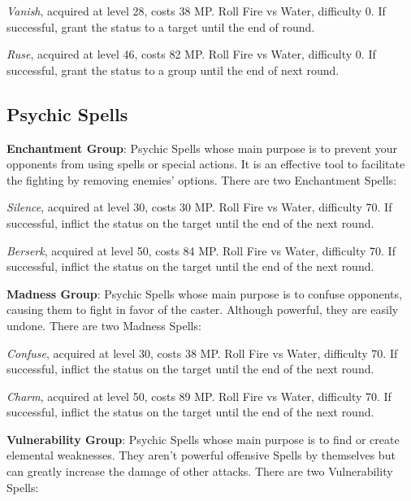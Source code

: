 \begin{multicols}{2}
    \textit{Vanish}, acquired at level 28, costs 38 MP\@. Roll Fire vs Water, difficulty 0. If successful, grant the  status to a target until the end of round.

    \textit{Ruse}, acquired at level 46, costs 82 MP\@. Roll Fire vs Water, difficulty 0. If successful, grant the  status to a group until the end of next round.

    \subsection{Psychic Spells}\label{subsec:white-psychic}

    \textbf{Enchantment Group}: Psychic Spells whose main purpose is to prevent your opponents from using spells or special actions. It is an effective tool to facilitate the fighting by removing enemies’ options. There are two Enchantment Spells:

    \textit{Silence}, acquired at level 30, costs 30 MP\@. Roll Fire vs Water, difficulty 70. If successful, inflict the  status on the target until the end of the next round.

    \textit{Berserk}, acquired at level 50, costs 84 MP\@. Roll Fire vs Water, difficulty 70. If successful, inflict the  status on the target until the end of the next round.

    \ffcrystal[type=level,height=8pt]

    \textbf{Madness Group}: Psychic Spells whose main purpose is to confuse opponents, causing them to fight in favor of the caster. Although powerful, they are easily undone. There are two Madness Spells:

    \textit{Confuse}, acquired at level 30, costs 38 MP\@. Roll Fire vs Water, difficulty 70. If successful, inflict the  status on the target until the end of the next round.

    \textit{Charm}, acquired at level 50, costs 89 MP\@. Roll Fire vs Water, difficulty 70. If successful, inflict the  status on the target until the end of the next round.

    \ffcrystal[type=level,height=8pt]

    \textbf{Vulnerability Group}: Psychic Spells whose main purpose is to find or create elemental weaknesses. They aren’t powerful offensive Spells by themselves but can greatly increase the damage of other attacks. There are two Vulnerability Spells:


\end{multicols}
